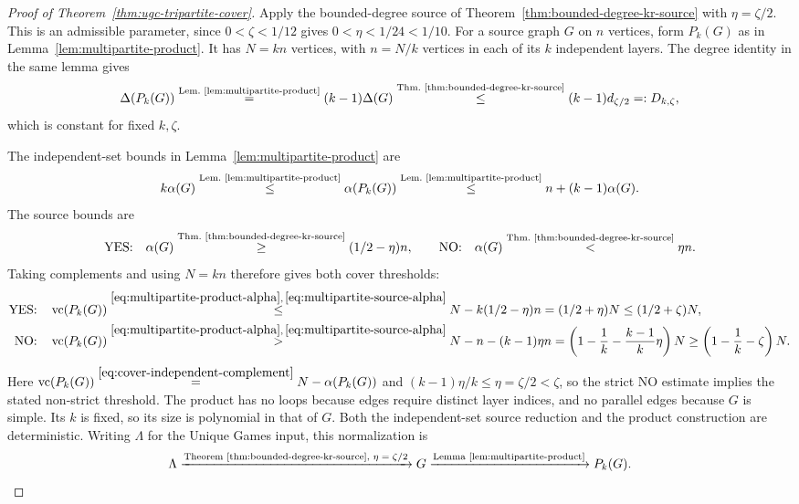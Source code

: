 \begin{proof}[Proof of Theorem~\ref{thm:ugc-tripartite-cover}]
Apply the bounded-degree source of Theorem~\ref{thm:bounded-degree-kr-source} with
$\eta=\zeta/2$. This is an admissible parameter,
since $0<\zeta<1/12$ gives $0<\eta<1/24<1/10$.
For a source graph $G$ on $n$ vertices, form $P_k(G)$ as in
Lemma~\ref{lem:multipartite-product}. It has $N=kn$ vertices,
with $n=N/k$ vertices in each of its $k$ independent layers.
The degree identity in the same lemma gives
\[
 \Delta(P_k(G))
 \overset{\text{Lem.~\ref{lem:multipartite-product}}}{=}(k-1)\Delta(G)
 \overset{\text{Thm.~\ref{thm:bounded-degree-kr-source}}}{\leq}
 (k-1)d_{\zeta/2}=:D_{k,\zeta},
\]
which is constant for fixed $k,\zeta$.

The independent-set bounds in Lemma~\ref{lem:multipartite-product} are
\begin{equation}\label{eq:multipartite-product-alpha}
 k\alpha(G)
 \overset{\text{Lem.~\ref{lem:multipartite-product}}}{\leq}\alpha(P_k(G))
 \overset{\text{Lem.~\ref{lem:multipartite-product}}}{\leq}
 n+(k-1)\alpha(G).
\end{equation}
The source bounds are
\begin{equation}\label{eq:multipartite-source-alpha}
 \textup{YES:}\quad
 \alpha(G)\overset{\text{Thm.~\ref{thm:bounded-degree-kr-source}}}{\geq}
 (1/2-\eta)n,
 \qquad
 \textup{NO:}\quad
 \alpha(G)\overset{\text{Thm.~\ref{thm:bounded-degree-kr-source}}}{<}\eta n.
\end{equation}
Taking complements and using
$N=kn$ therefore gives both cover thresholds:
\[
\begin{aligned}
 \textup{YES:}\quad\operatorname{vc}(P_k(G))
 &\overset{\eqref{eq:multipartite-product-alpha},\,\eqref{eq:multipartite-source-alpha}}{\leq}
 N-k(1/2-\eta)n
 =(1/2+\eta)N\leq(1/2+\zeta)N,\\
 \textup{NO:}\quad\operatorname{vc}(P_k(G))
 &\overset{\eqref{eq:multipartite-product-alpha},\,\eqref{eq:multipartite-source-alpha}}{>}
 N-n-(k-1)\eta n
  =\left(1-\frac1k-\frac{k-1}{k}\eta\right)N
 \geq\left(1-\frac1k-\zeta\right)N.\end{aligned}
\]
Here $\operatorname{vc}(P_k(G))\overset{\eqref{eq:cover-independent-complement}}{=}N-\alpha(P_k(G))$ and
$(k-1)\eta/k\leq\eta=\zeta/2<\zeta$, so the strict NO estimate
implies the stated non-strict threshold. The product has no
loops because edges require distinct layer indices, and no parallel
edges because $G$ is simple. Its $k$ is fixed, so its size is
polynomial in that of $G$. Both the independent-set source reduction
and the product construction are deterministic.
Writing $\Lambda$ for the Unique Games input, this normalization is
\[
 \Lambda
 \xrightarrow{\text{Theorem~\ref{thm:bounded-degree-kr-source}, $\eta=\zeta/2$}}G
 \xrightarrow{\text{Lemma~\ref{lem:multipartite-product}}}P_k(G).
\]
\end{proof}

